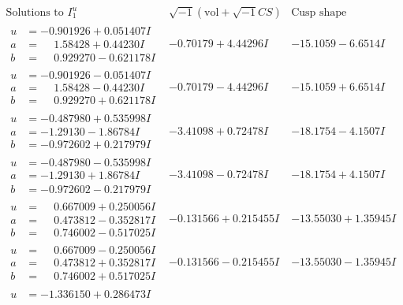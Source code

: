 \documentclass[1p]{elsarticle_modified}
\theoremstyle{definition}
\newcommand{\I}{\sqrt{-1}}
\begin{document}
$$\begin{array}{c|c|c}  
\text{Solutions to }I^u_{1}& \I (\text{vol} + \sqrt{-1}CS) & \text{Cusp shape}\\
 \hline 
\begin{aligned}
u &= -0.901926 + 0.051407 I \\
a &= \phantom{-}1.58428 + 0.44230 I \\
b &= \phantom{-}0.929270 - 0.621178 I\end{aligned}
 & -0.70179 + 4.44296 I & -15.1059 - 6.6514 I \\ \hline\begin{aligned}
u &= -0.901926 - 0.051407 I \\
a &= \phantom{-}1.58428 - 0.44230 I \\
b &= \phantom{-}0.929270 + 0.621178 I\end{aligned}
 & -0.70179 - 4.44296 I & -15.1059 + 6.6514 I \\ \hline\begin{aligned}
u &= -0.487980 + 0.535998 I \\
a &= -1.29130 - 1.86784 I \\
b &= -0.972602 + 0.217979 I\end{aligned}
 & -3.41098 + 0.72478 I & -18.1754 - 4.1507 I \\ \hline\begin{aligned}
u &= -0.487980 - 0.535998 I \\
a &= -1.29130 + 1.86784 I \\
b &= -0.972602 - 0.217979 I\end{aligned}
 & -3.41098 - 0.72478 I & -18.1754 + 4.1507 I \\ \hline\begin{aligned}
u &= \phantom{-}0.667009 + 0.250056 I \\
a &= \phantom{-}0.473812 - 0.352817 I \\
b &= \phantom{-}0.746002 - 0.517025 I\end{aligned}
 & -0.131566 + 0.215455 I & -13.55030 + 1.35945 I \\ \hline\begin{aligned}
u &= \phantom{-}0.667009 - 0.250056 I \\
a &= \phantom{-}0.473812 + 0.352817 I \\
b &= \phantom{-}0.746002 + 0.517025 I\end{aligned}
 & -0.131566 - 0.215455 I & -13.55030 - 1.35945 I \\ \hline\begin{aligned}
u &= -1.336150 + 0.286473 I \\

\end{aligned}
\end{array}$$
\end{document}
